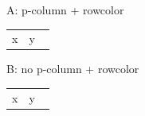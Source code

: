 \documentclass{article}
\begin{document}
A: p-column + rowcolor
\begin{tabular}{@{}p{3cm}l@{}}
\rowcolor{ab} x & y \
\end{tabular}

B: no p-column + rowcolor
\begin{tabular}{@{}ll@{}}
\rowcolor{ab} x & y \
\end{tabular}
\end{document}
